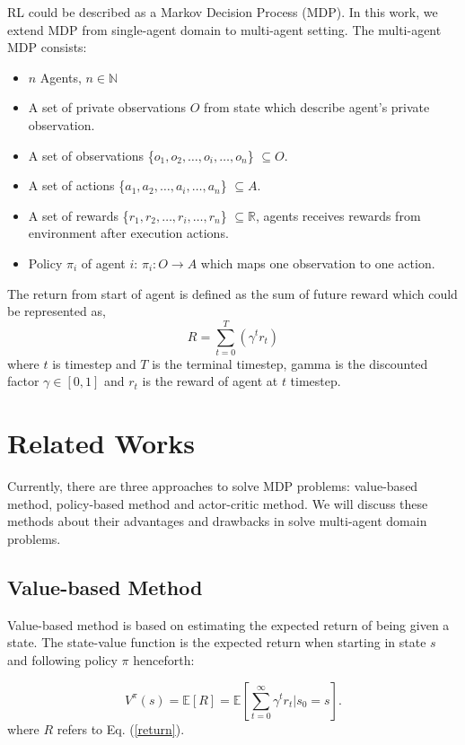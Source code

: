 \documentclass[11pt,twocolumn]{jarticle} %
\begin{document}
RL could be described as a Markov Decision Process (MDP). In this work, we extend MDP from single-agent domain to multi-agent setting. The multi-agent MDP consists:
\begin{itemize}
  \item $n$ Agents, $n \in \mathbb{N}$
  \item A set of private observations $O$ from state which describe agent's private observation. 
  \item A set of observations \{${o_1, o_2,\ldots, o_i, \ldots, o_n}$\} $\subseteq O$.
  \item A set of actions \{${a_1, a_2,\ldots, a_i, \ldots, a_n}$\} $\subseteq A$.
  \item A set of rewards \{${r_1, r_2,\ldots, r_i, \ldots, r_n}$\} $\subseteq \mathbb{R}$, agents receives rewards from environment after execution actions.
  \item Policy $\pi_i$ of agent $i$: $\pi_i: O \rightarrow A$ which maps one observation to one action.
\end{itemize}
The return from start of agent is defined as the sum of future reward which could be represented as, 
\begin{equation}
\label{return}
R = \sum_{t=0}^{T}(\gamma^t r_t)
\end{equation}
where $t$ is timestep and $T$ is the terminal timestep, gamma is the discounted factor $\gamma \in [0, 1]$ and $r_t$ is the reward of agent at $t$ timestep.

\section{Related Works}

Currently, there are three approaches to solve MDP problems: value-based method, policy-based method and actor-critic method. We will discuss these methods about their advantages and drawbacks in solve multi-agent domain problems.

\subsection{Value-based Method}

Value-based method is based on estimating the expected return of being given a state. The state-value function is the expected return when starting in state $s$ and following policy $\pi$ henceforth: 

\begin{equation}
V^\pi(s) = \mathbb{E}[R] = \mathbb{E}[\sum_{t=0}^{\infty}\gamma^t r_t | s_0 = s].
\end{equation}
where $R$ refers to Eq. (\ref{return}). \par
\end{document}
